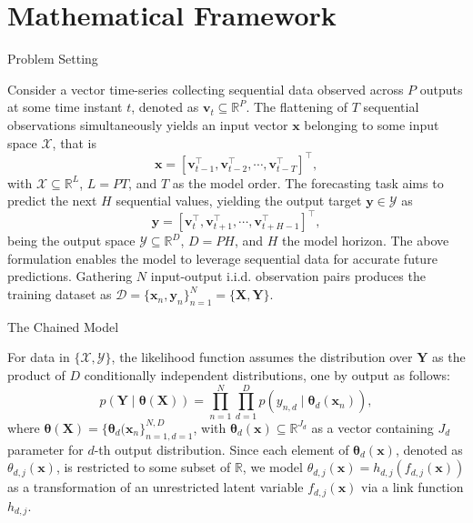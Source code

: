 \section{Mathematical Framework}

\begin{frame}{Problem Setting}

Consider a vector time-series collecting sequential data observed across $P$ outputs at some time instant \( t \), denoted as \( \boldsymbol{v}_t \subseteq \mathbb{R}^{P}\). The flattening of \( T \) sequential observations simultaneously yields an input vector \( \boldsymbol{x} \) belonging to some input space \( \mathcal{X} \), that is
\[
\boldsymbol{x}= [ \boldsymbol{v}_{t-1}^\top, \boldsymbol{v}_{t-2}^\top, \cdots, \boldsymbol{v}_{t-T}^\top  ]^\top,
\]
with \( {\mathcal{X}} \subseteq \mathbb{R}^{L} \), \( L = PT \), and \( T \) as the model order. The forecasting task aims to predict the next \(H\) sequential values, yielding the output target \( \boldsymbol{y} \in {\mathcal{Y}} \) as
\[
\boldsymbol{y} = [ \boldsymbol{v}_{t}^\top, \boldsymbol{v}_{t+1}^\top, \cdots, \boldsymbol{v}_{t+H-1}^\top  ]^\top,
\] 
being the output space \( {\mathcal{Y}} \subseteq \mathbb{R}^{D} \), \( D = PH \), and \( H \) the model horizon. The above formulation enables the model to leverage sequential data for accurate future predictions. Gathering \( N \) input-output i.i.d. observation pairs produces the training dataset as \( {\mathcal{D}} = \{\boldsymbol{x}_n, \boldsymbol{y}_n\}_{n=1}^N = \{ \boldsymbol{X}, \boldsymbol{Y}\} \).

\end{frame}

\begin{frame}{The Chained Model}

For data in $\{\mathcal{X},\mathcal{Y}\}$, the likelihood function assumes the distribution over \(  \boldsymbol{Y} \) as the product of \( D \) conditionally independent distributions, one by output as follows:
\begin{equation}\label{eq:likelihood_funciton}
	p(\boldsymbol{Y} \mid \boldsymbol{\theta}(\boldsymbol{X})) = \prod_{n=1}^N \prod_{d=1}^D p\left(y_{n,d} \mid \boldsymbol{\theta}_d(\boldsymbol{x}_n)\right),
\end{equation}
where \( \boldsymbol{\theta}(\boldsymbol{X}) = \{ \boldsymbol{\theta}_d(\boldsymbol{x}_n \}_{n=1,d=1}^{N, D} \), with \( \boldsymbol{\theta}_d(\boldsymbol{x}) \subseteq \mathbb{R}^{J_d} \) as a vector containing \( J_d \) parameter for \( d \)-th output distribution. Since each element of \( \boldsymbol{\theta}_d(\boldsymbol{x}) \), denoted as \( \theta_{d,j}(\boldsymbol{x}) \), is restricted to some subset of \( \mathbb{R} \), we model \( \theta_{d,j}(\boldsymbol{x}) = h_{d,j}(f_{d,j}(\boldsymbol{x})) \) as a transformation of an unrestricted latent variable \( f_{d,j}(\boldsymbol{x}) \) via a link function \( h_{d,j} \).

\end{frame}
